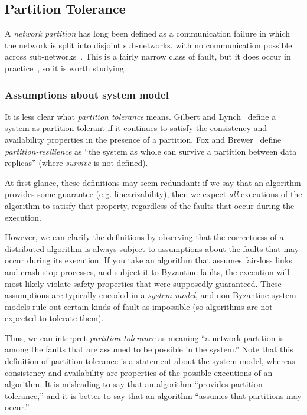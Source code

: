 \documentclass[a4paper,twocolumn,10pt]{article}
\begin{document}
\subsection{Partition Tolerance}\label{sec:partitions}

A \emph{network partition} has long been defined as a communication failure in which the network is
split into disjoint sub-networks, with no communication possible across
sub-networks~\cite{Johnson1975we}. This is a fairly narrow class of fault, but it does occur in
practice~\cite{Bailis2014jx}, so it is worth studying.

\subsubsection{Assumptions about system model}

It is less clear what \emph{partition tolerance} means. Gilbert and Lynch~\cite{Gilbert2002il}
define a system as partition-tolerant if it continues to satisfy the consistency and availability
properties in the presence of a partition. Fox and Brewer~\cite{Fox1999bs} define
\emph{partition-resilience} as ``the system as whole can survive a partition between data replicas''
(where \emph{survive} is not defined).

At first glance, these definitions may seem redundant: if we say that an algorithm provides some
guarantee (e.g. linearizability), then we expect \emph{all} executions of the algorithm to satisfy
that property, regardless of the faults that occur during the execution.

However, we can clarify the definitions by observing that the correctness of a distributed algorithm
is always subject to assumptions about the faults that may occur during its execution. If you take
an algorithm that assumes fair-loss links and crash-stop processes, and subject it to Byzantine
faults, the execution will most likely violate safety properties that were supposedly guaranteed.
These assumptions are typically encoded in a \emph{system model}, and non-Byzantine system models
rule out certain kinds of fault as impossible (so algorithms are not expected to tolerate them).

Thus, we can interpret \emph{partition tolerance} as meaning ``a network partition is among the
faults that are assumed to be possible in the system.'' Note that this definition of partition
tolerance is a statement about the system model, whereas consistency and availability are properties
of the possible executions of an algorithm. It is misleading to say that an algorithm ``provides
partition tolerance,'' and it is better to say that an algorithm ``assumes that partitions may
occur.''
\end{document}
